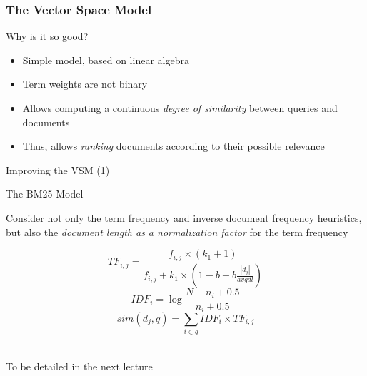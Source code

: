 \documentclass[svgnames]{beamer}
\begin{document}

\begin{frame}  \frametitle{The Vector Space Model}

  \begin{block}{Why is it so good?}
    \begin{itemize}
    \item Simple model, based on linear algebra
    \item Term weights are not binary
    \item Allows computing a continuous \emph{degree of similarity} between
      queries and documents
    \item Thus, allows \emph{ranking} documents according to their possible
      relevance
    \end{itemize}
  \end{block}
\end{frame}

\begin{frame}{Improving the VSM (1)}

\begin{block}{The BM25 Model}

    Consider not only the term frequency and inverse document frequency heuristics, but also the \emph{document length as a normalization factor} for the term frequency

    \begin{displaymath}
          TF_{i,j} = \frac{f_{i,j} \times (k_1 + 1)}
                                  {f_{i,j} + k_1 \times \left( 1-b+b\frac{|d_j|}{avgdl} \right)}
    \end{displaymath}
    \begin{displaymath}
        IDF_i = \log\frac{N - n_i + 0.5}{n_i + 0.5}
    \end{displaymath}
    \begin{displaymath}
          sim(d_j,q) =
          \sum_{i \in q} IDF_i \times TF_{i,j} 
    \end{displaymath}

    ~\\
    To be detailed in the next lecture
\end{block}
    
\end{frame}
\end{document}
